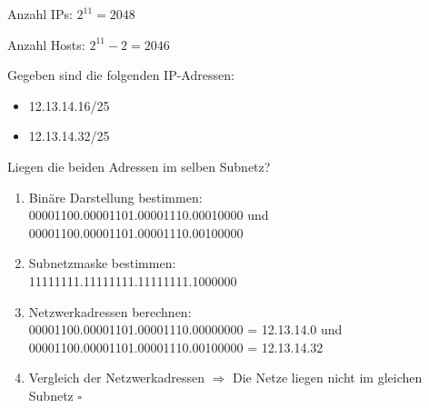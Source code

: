 Anzahl IPs: $2^{11} = 2048$

Anzahl Hosts: $2^{11} - 2 = 2046$

Gegeben sind die folgenden IP-Adressen:

\begin{itemize}
    \item 12.13.14.16/25
    \item 12.13.14.32/25
\end{itemize}

Liegen die beiden Adressen im selben Subnetz?

\begin{enumerate}
    \item Binäre Darstellung bestimmen: \\ 00001100.00001101.00001110.00010000 und \\ 00001100.00001101.00001110.00100000
    \item Subnetzmaske bestimmen: \\ 11111111.11111111.11111111.1000000
    \item Netzwerkadressen berechnen: \\ 00001100.00001101.00001110.00000000 = 12.13.14.0 und \\ 00001100.00001101.00001110.00100000 = 12.13.14.32
    \item Vergleich der Netzwerkadressen $\Rightarrow$ Die Netze liegen nicht im gleichen Subnetz $\square$
\end{enumerate}